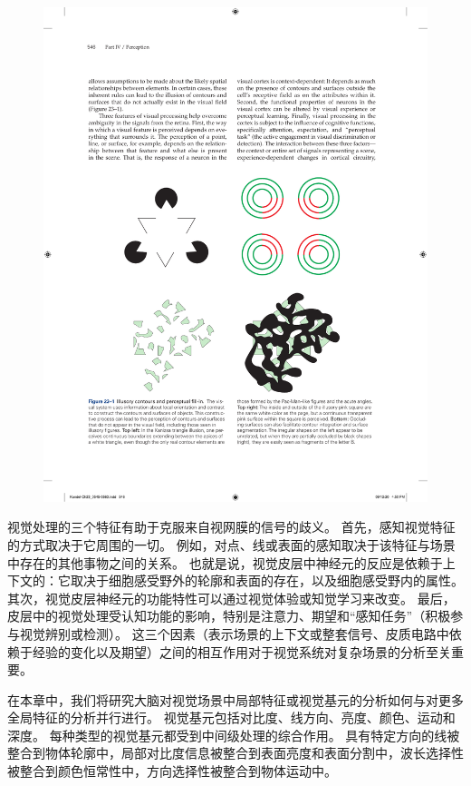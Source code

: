 \begin{figure}[htbp]
	\centering
	\includegraphics[width=1.0\linewidth]{chap23/fig_23_1}
	\caption{}
	\label{fig:23_1}
\end{figure}


视觉处理的三个特征有助于克服来自视网膜的信号的歧义。 
首先，感知视觉特征的方式取决于它周围的一切。 
例如，对点、线或表面的感知取决于该特征与场景中存在的其他事物之间的关系。 
也就是说，视觉皮层中神经元的反应是依赖于上下文的：它取决于细胞感受野外的轮廓和表面的存在，以及细胞感受野内的属性。 
其次，视觉皮层神经元的功能特性可以通过视觉体验或知觉学习来改变。 
最后，皮层中的视觉处理受认知功能的影响，特别是注意力、期望和“感知任务”（积极参与视觉辨别或检测）。 
这三个因素（表示场景的上下文或整套信号、皮质电路中依赖于经验的变化以及期望）之间的相互作用对于视觉系统对复杂场景的分析至关重要。


在本章中，我们将研究大脑对视觉场景中局部特征或视觉基元的分析如何与对更多全局特征的分析并行进行。 
视觉基元包括对比度、线方向、亮度、颜色、运动和深度。 
每种类型的视觉基元都受到中间级处理的综合作用。 
具有特定方向的线被整合到物体轮廓中，局部对比度信息被整合到表面亮度和表面分割中，波长选择性被整合到颜色恒常性中，方向选择性被整合到物体运动中。


